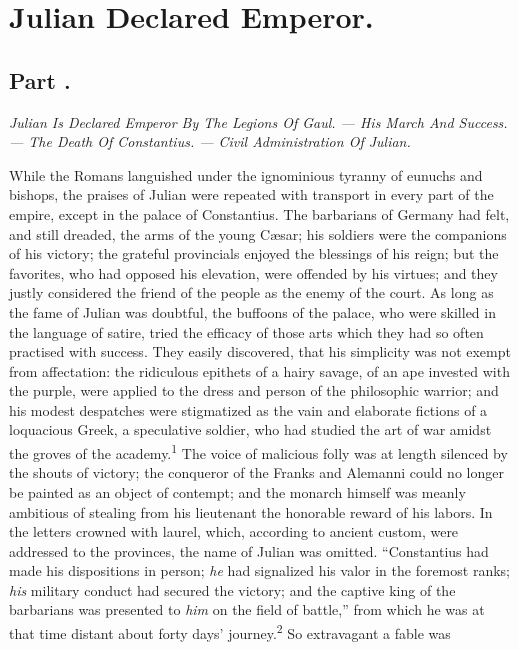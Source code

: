 \chapter{Julian Declared Emperor.}
\section{Part \thesection.}

\textit{Julian Is Declared Emperor By The Legions Of Gaul. — His March And
Success. — The Death Of Constantius. — Civil Administration Of Julian.}
\vspace{\onelineskip}

While the Romans languished under the ignominious tyranny of
eunuchs and bishops, the praises of Julian were repeated with
transport in every part of the empire, except in the palace of
Constantius. The barbarians of Germany had felt, and still
dreaded, the arms of the young Cæsar; his soldiers were the
companions of his victory; the grateful provincials enjoyed the
blessings of his reign; but the favorites, who had opposed his
elevation, were offended by his virtues; and they justly
considered the friend of the people as the enemy of the court. As
long as the fame of Julian was doubtful, the buffoons of the
palace, who were skilled in the language of satire, tried the
efficacy of those arts which they had so often practised with
success. They easily discovered, that his simplicity was not
exempt from affectation: the ridiculous epithets of a hairy
savage, of an ape invested with the purple, were applied to the
dress and person of the philosophic warrior; and his modest
despatches were stigmatized as the vain and elaborate fictions of
a loquacious Greek, a speculative soldier, who had studied the
art of war amidst the groves of the academy.\textsuperscript{1} The voice of
malicious folly was at length silenced by the shouts of victory;
the conqueror of the Franks and Alemanni could no longer be
painted as an object of contempt; and the monarch himself was
meanly ambitious of stealing from his lieutenant the honorable
reward of his labors. In the letters crowned with laurel, which,
according to ancient custom, were addressed to the provinces, the
name of Julian was omitted. “Constantius had made his
dispositions in person; \textit{he} had signalized his valor in the
foremost ranks; \textit{his} military conduct had secured the victory;
and the captive king of the barbarians was presented to \textit{him} on
the field of battle,” from which he was at that time distant
about forty days’ journey.\textsuperscript{2} So extravagant a fable was
